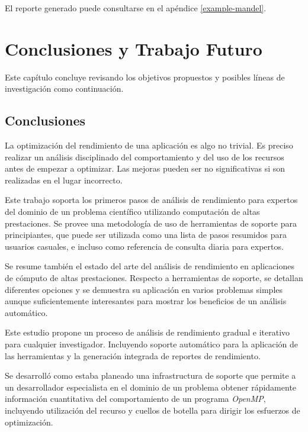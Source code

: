 \documentclass[a4paper]{report}
\begin{document}
\bigskip

El reporte generado puede consultarse en el apéndice \ref{example-mandel}.

\chapter{Conclusiones y Trabajo Futuro} \label{Conclusiones y Trabajo Futuro}

Este capítulo concluye revisando los objetivos propuestos y posibles líneas de investigación como continuación.

\section{Conclusiones}

La optimización del rendimiento de una aplicación es algo no trivial.
Es preciso realizar un análisis disciplinado del comportamiento y del uso de los recursos antes de
empezar a optimizar. Las mejoras pueden ser no significativas si son realizadas en el lugar incorrecto.

\bigskip

Este trabajo soporta los primeros pasos de análisis de rendimiento para expertos del dominio de un problema científico utilizando computación de altas prestaciones. Se provee una metodología de uso de herramientas de soporte para principiantes, que puede ser utilizada como una lista de pasos resumidos para usuarios casuales, e incluso como referencia de consulta diaria para expertos.

\bigskip

Se resume también el estado del arte del análisis de rendimiento en aplicaciones de cómputo de altas prestaciones. Respecto a herramientas de soporte, se detallan diferentes opciones y se demuestra su aplicación en varios problemas simples aunque suficientemente interesantes para mostrar los beneficios de un análisis automático. 

\bigskip

Este estudio propone un proceso de análisis de rendimiento gradual e iterativo para cualquier investigador. 
Incluyendo soporte automático para la aplicación de las herramientas y la generación integrada de
reportes de rendimiento.

\bigskip

Se desarrolló como estaba planeado una infrastructura de soporte que permite a un desarrollador especialista en el dominio de un problema obtener rápidamente información cuantitativa del comportamiento de un programa {\it OpenMP}, incluyendo utilización del recurso y cuellos de botella para dirigir los esfuerzos de optimización.
\end{document}

